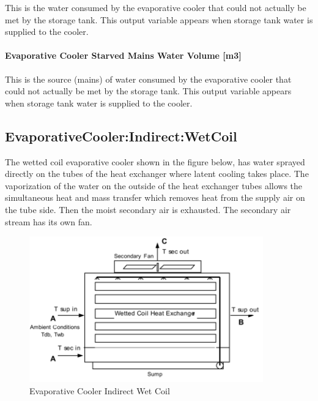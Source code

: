 This is the water consumed by the evaporative cooler that could not actually be met by the storage tank. This output variable appears when storage tank water is supplied to the cooler.

\paragraph{Evaporative Cooler Starved Mains Water Volume {[}m3{]}}\label{evaporative-cooler-starved-mains-water-volume-m3-2}

This is the source (mains) of water consumed by the evaporative cooler that could not actually be met by the storage tank. This output variable appears when storage tank water is supplied to the cooler.

\subsection{EvaporativeCooler:Indirect:WetCoil}\label{evaporativecoolerindirectwetcoil}

The wetted coil evaporative cooler shown in the figure below, has water sprayed directly on the tubes of the heat exchanger where latent cooling takes place. The vaporization of the water on the outside of the heat exchanger tubes allows the simultaneous heat and mass transfer which removes heat from the supply air on the tube side. Then the moist secondary air is exhausted. The secondary air stream has its own fan.

\begin{figure}[hbtp] %
\centering
\includegraphics[width=0.9\textwidth, height=0.9\textheight, keepaspectratio=true]{media/image421.png}
\caption{Evaporative Cooler Indirect Wet Coil \protect \label{fig:evaporative-cooler-indirect-wet-coil}}
\end{figure}

